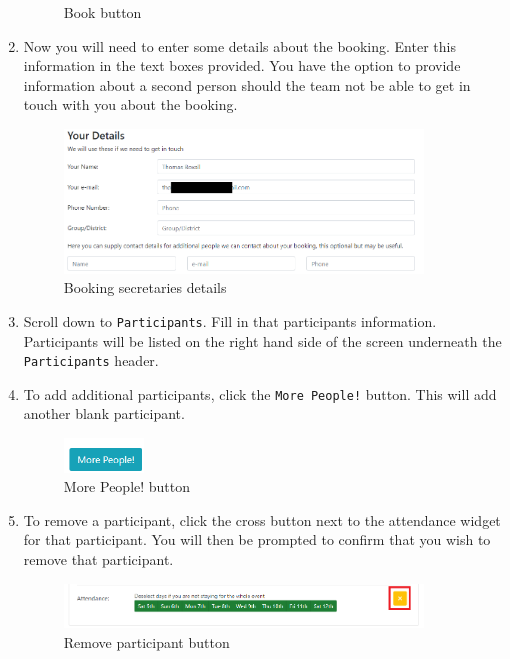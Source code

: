\begin{enumerate}
\begin{figure}[H]
        \caption{Book button}
    \end{figure}
    \item Now you will need to enter some details about the booking. Enter this information in the text boxes provided. You have the option to provide information about a second person should the team not be able to get in touch with you about the booking.
    \begin{figure}[H]
        \centering
        \includegraphics[width=0.9\textwidth]{assets/book-bookingSecDetails.png}
        \caption{Booking secretaries details}
    \end{figure}
    \item Scroll down to \verb|Participants|. Fill in that participants information. Participants will be listed on the right hand side of the screen underneath the \verb|Participants| header.
    \item To add additional participants, click the \verb|More People!| button. This will add another blank participant.
    \begin{figure}[H]
        \centering
        \includegraphics[width=0.2\textwidth]{assets/book-morePeople.png}
        \caption{More People! button}
    \end{figure}
    \item To remove a participant, click the cross button next to the attendance widget for that participant. You will then be prompted to confirm that you wish to remove that participant.
    \begin{figure}[H]
        \centering
        \includegraphics[width=0.9\textwidth]{assets/book-removeParticipant.png}
        \caption{Remove participant button}

\end{figure}
\end{enumerate}
